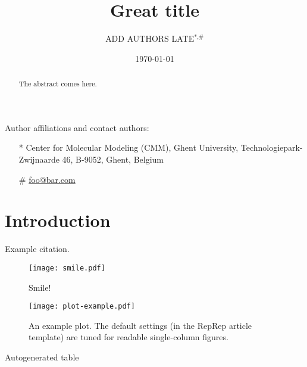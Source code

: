 \documentclass[11pt]{article}
\title{Great title}
\author{ADD AUTHORS LATE$^\text{*,\#}$}
\date{\today}
\begin{document}
    \maketitle

    Author affiliations and contact authors:
    \begin{itemize}
        \item[*] Center for Molecular Modeling (CMM), Ghent University, Technologiepark-Zwijnaarde 46, B-9052, Ghent, Belgium
        \item[\#] \href{mailto:foo@bar.com}{foo@bar.com}
    \end{itemize}

    \begin{abstract}
        The abstract comes here.
    \end{abstract}

    \newpage
    \linenumbers

    \section{Introduction}
    \label{sec:introduction}

    Example citation.\cite{knuth:1984}

    \begin{figure}
        \begin{center}
            \texttt{[image: smile.pdf]}
        \end{center}
        \caption{Smile!}
        \label{fig:smile}
    \end{figure}

    \begin{figure}
        \begin{center}
            \texttt{[image: plot-example.pdf]}
        \end{center}
        \caption{
            An example plot.
            The default settings (in the RepRep article template)
            are tuned for readable single-column figures.
        }
        \label{fig:plot-example}
    \end{figure}

    \begin{table}
        \begin{center}
        
        \end{center}
        \label{tab:auto}
        \caption{Autogenerated table}
    \end{table}
\end{document}
